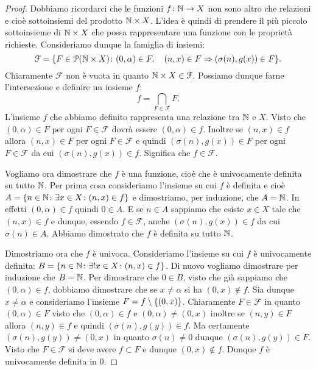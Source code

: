\begin{proof}
Dobbiamo ricordarci che le funzioni $f\colon {\mathbb N} \to X$ non sono altro che relazioni 
e cioè sottoinsiemi del prodotto ${\mathbb N}\times X$.
L'idea è quindi di prendere il più piccolo sottoinsieme di ${\mathbb N}\times X$ 
che possa rappresentare una funzione con le proprietà richieste.
Consideriamo dunque la famiglia di insiemi:
\[
\mathcal F = {\left\{ F\in \mathcal P({\mathbb N}\times X)\colon 
  (0,\alpha)\in F,\quad (n,x)\in F \Rightarrow (\sigma(n),g(x))\in F \right\}}.
\]
Chiaramente $\mathcal F$ non è vuota in quanto ${\mathbb N}\times X \in \mathcal F$.
Possiamo dunque farne l'intersezione e definire un insieme $f$:
\[
  f = \bigcap_{F\in \mathcal F} F.
\]
L'insieme $f$ che abbiamo definito rappresenta una relazione tra ${\mathbb N}$ e $X$.
Visto che $(0,\alpha)\in F$ per ogni $F\in \mathcal F$ dovrà essere 
$(0,\alpha)\in f$.
Inoltre se $(n,x)\in f$ allora $(n,x)\in F$ per ogni $F\in \mathcal F$ 
e quindi $(\sigma(n),g(x))\in F$ per ogni $F\in \mathcal F$
da cui $(\sigma(n),g(x))\in f$. Significa che $f\in \mathcal F$.

Vogliamo ora dimostrare che $f$ è una funzione, cioè che è univocamente definita 
su tutto ${\mathbb N}$.
Per prima cosa consideriamo l'insieme su cui $f$ è definita 
e cioè $A={\left\{ n\in {\mathbb N}\colon \exists x\in X\colon (n,x)\in f \right\}}$
e dimostriamo, per induzione, che $A={\mathbb N}$.
In effetti $(0,\alpha)\in f$ quindi $0\in A$. 
E se $n\in A$ sappiamo che esiste $x\in X$ tale che $(n,x)\in f$ 
e dunque, essendo $f\in \mathcal F$, anche $(\sigma(n),g(x))\in f$
da cui $\sigma(n)\in A$. 
Abbiamo dimostrato che $f$ è definita su tutto ${\mathbb N}$.

Dimostriamo ora che $f$ è univoca. Consideriamo 
l'insieme su cui $f$ è univocamente definita: 
$B={\left\{ n\in {\mathbb N}\colon \exists! x\in X\colon (n,x)\in f \right\}}$.
Di nuovo vogliamo dimostrare per induzione che $B={\mathbb N}$. 
Per dimostrare che $0\in B$, visto che già sappiamo che $(0,\alpha)\in f$, 
dobbiamo dimostrare che se $x\neq \alpha$ si ha $(0,x)\not\in f$.
Sia dunque $x\neq \alpha$ e consideriamo 
l'insieme $F=f\setminus{\left\{ (0,x) \right\}}$.
Chiaramente $F\in \mathcal F$ in quanto $(0,\alpha)\in F$
visto che $(0,\alpha)\in f$ e $(0,\alpha)\neq (0,x)$
inoltre se $(n,y)\in F$ allora $(n,y)\in f$ 
e quindi $(\sigma(n),g(y)) \in f$.
Ma certamente $(\sigma(n),g(y))\neq (0,x)$ in quanto $\sigma(n)\neq 0$ 
dunque $(\sigma(n),g(y))\in F$.
Visto che $F\in \mathcal F$ si deve avere $f\subset F$ e dunque 
$(0,x)\not \in f$. Dunque $f$ è univocamente definita in $0$.


\end{proof}
